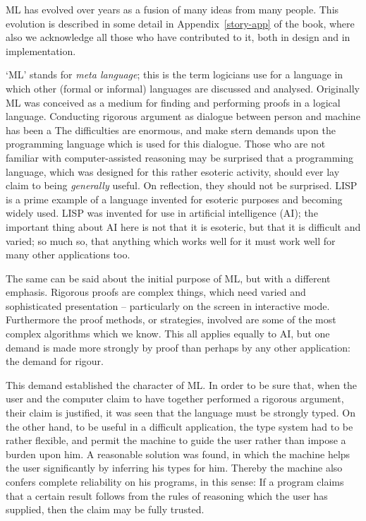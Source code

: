 ML has evolved over  years as a fusion of many ideas
from many people. This evolution is
described in some detail in Appendix~\ref{story-app} of the book, where also we
acknowledge all those who have contributed to it, both in design
and in implementation.

`ML' stands for
{\sl meta language}; this is the term logicians use for a language in which
other (formal or informal) languages are discussed and analysed.
Originally ML was conceived as a medium for finding and performing
proofs in a logical language.   Conducting rigorous argument as dialogue
between person and machine has been a  The difficulties are enormous,
and make stern demands
upon the programming language which is used for this dialogue.   Those who are
not familiar with computer-assisted reasoning may be surprised that a
programming language, which was designed for this rather esoteric activity,
should ever lay claim to being {\sl generally} useful.
On reflection, they should not be surprised.  LISP is a prime example of
a language invented for esoteric purposes and becoming widely used.  LISP
was invented for use in artificial intelligence (AI); the important thing
about AI here is not that it is esoteric,  but that
it is difficult and varied; so much so, that anything which works well for
it must work well for many other applications too.

The same can be said about the initial purpose of ML, but with a different
emphasis.  Rigorous proofs are complex things, which need varied
and sophisticated presentation -- particularly on the screen in interactive
mode. Furthermore the proof methods, or
strategies, involved are some of the most complex algorithms which we know.
This all applies equally to AI, but one demand is made more strongly
by proof than perhaps by any other application: the demand for rigour.

This demand established the character of ML.  In order to be sure that,
when the user and the computer claim to have together performed a rigorous
argument, their claim is justified, it was seen
that the language must be strongly typed. On the other hand, to be
useful in a difficult  application, the type system had to be rather
flexible, and permit the machine to guide the user rather than impose
a burden upon him.   A reasonable solution was found, in which the machine
helps the user significantly  by
inferring his types for him. Thereby the machine also confers complete
reliability on his programs, in this sense:
If a program claims that a certain result
follows from the rules of reasoning which the user has supplied, then the
claim may be fully trusted.

